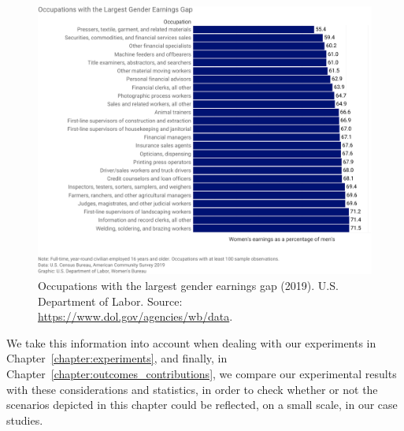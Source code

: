 \begin{figure}[t!]
\includegraphics[scale=.7]{figures/dol_occupations_with_largest_gender_earnings_gap.pdf}
\centering
\caption{Occupations with the largest gender earnings gap (2019).\newline
U.S. Department of Labor. Source: \upshape\protect\url{https://www.dol.gov/agencies/wb/data}.}
\label{fig:dol_occupations_with_largest_gender_earnings_gap}
\end{figure}

We take this information into account when dealing with our experiments in Chapter~\ref{chapter:experiments}, and finally, in Chapter~\ref{chapter:outcomes_contributions}, we compare our experimental results with these considerations and statistics, in order to check whether or not the scenarios depicted in this chapter could be reflected, on a small scale, in our case studies.
